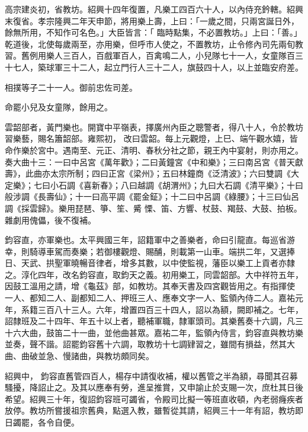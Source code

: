 \begin{pinyinscope}
 高宗建炎初，省教坊。紹興十四年復置，凡樂工四百六十人，以內侍充鈐轄。紹興末復省。孝宗隆興二年天申節，將用樂上壽，上曰：「一歲之間，只兩宮誕日外，餘無所用，不知作可名色。」大臣皆言：「
 臨時點集，不必置教坊。」上曰：「善。」乾道後，北使每歲兩至，亦用樂，但呼市人使之，不置教坊，止令修內司先兩旬教習。舊例用樂人三百人，百戲軍百人，百禽鳴二人，小兒隊七十一人，女童隊百三十七人，築球軍三十二人，起立門行人三十二人，旗鼓四十人，以上並臨安府差。



 相撲等子二十一人。御前忠佐司差。



 命罷小兒及女童隊，餘用之。



 雲韶部者，黃門樂也。開寶中平嶺表，擇廣州內臣之聰警者，得八十人，令於教坊習樂藝，賜名簫韶部。雍熙初，
 改曰雲韶。每上元觀燈，上巳、端午觀水嬉，皆命作樂於宮中。遇南至、元正、清明、春秋分社之節，親王內中宴射，則亦用之。奏大曲十三：一曰中呂宮《萬年歡》；二曰黃鐘宮《中和樂》；三曰南呂宮《普天獻壽》，此曲亦太宗所制；四曰正宮《梁州》；五曰林鐘商《泛清波》；六曰雙調《大定樂》；七曰小石調《喜新春》；八曰越調《胡渭州》；九曰大石調《清平樂》；十曰般涉調《長壽仙》；十一曰高平調《罷金鉦》；十二曰中呂調《綠腰》；十三曰仙呂調《採雲歸》。樂用琵琶、箏、笙、觱
 慄、笛、方響、杖鼓、羯鼓、大鼓、拍板。雜劇用傀儡，後不復補。



 鈞容直，亦軍樂也。太平興國三年，詔籍軍中之善樂者，命曰引龍直。每巡省游幸，則騎導車駕而奏樂；若御樓觀燈、賜酺，則載第一山車。端拱二年，又選捧日、天武、拱聖軍曉暢音律者，增多其數，以中使監視，藩臣以樂工上貢者亦隸之。淳化四年，改名鈞容直，取鈞天之義。初用樂工，同雲韶部。大中祥符五年，因鼓工溫用之請，增《龜茲》部，如教坊。其奉天書及四宮觀皆用之。有指揮使
 一人、都知二人、副都知二人、押班三人、應奉文字一人、監領內侍二人。嘉祐元年，系籍三百八十三人。六年，增置四百三十四人，詔以為額，闕即補之。七年，詔隸班及二十四年、年五十以上者，聽補軍職，隸軍頭司。其樂舊奏十六調，凡三十六大曲，鼓笛二十一曲，並他曲甚眾。嘉祐二年，監領內侍言，鈞容直與教坊樂並奏，聲不諧。詔罷鈞容舊十六調，取教坊十七調肄習之，雖間有損益，然其大曲、曲破並急、慢諸曲，與教坊頗同矣。



 紹興中，
 鈞容直舊管四百人，楊存中請復收補，權以舊管之半為額，尋聞其召募騷擾，降詔止之。及其以應奉有勞，進呈推賞，又申諭止於支賜一次，庶杜其日後希望。紹興三十年，復詔鈞容班可蠲省，令殿司比擬一等班直收頓，內老弱癃疾者放停。教坊所嘗援祖宗舊典，點選入教，雖暫從其請，紹興三十一年有詔，教坊即日蠲罷，各令自便。




\end{pinyinscope}
